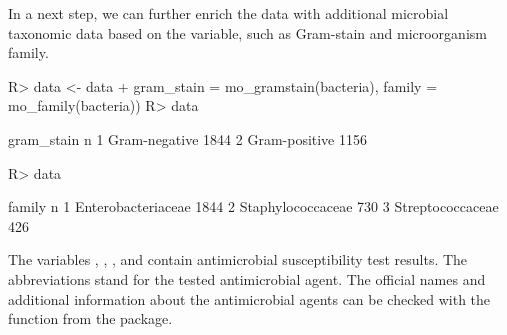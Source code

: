\documentclass[article, shortnames]{jss}
\newcommand{\fct}[1]{\code{#1()}}
\begin{document}
%
In a next step, we can further enrich the data with additional microbial
taxonomic data based on the  variable, such as Gram-stain and
microorganism family.
%
\begin{CodeChunk}
\begin{CodeInput}
R> data <- data %
+    gram_stain = mo_gramstain(bacteria), family = mo_family(bacteria))
R> data %
\end{CodeInput}
\begin{CodeOutput}
     gram_stain    n
1 Gram-negative 1844
2 Gram-positive 1156
\end{CodeOutput}
\begin{CodeInput}
R> data %
\end{CodeInput}
\begin{CodeOutput}
              family    n
1 Enterobacteriaceae 1844
2  Staphylococcaceae  730
3   Streptococcaceae  426
\end{CodeOutput}
\end{CodeChunk}
%
The variables , , , and  contain antimicrobial
susceptibility test results.  The abbreviations stand for the tested
antimicrobial agent.  The official names and additional information about
the antimicrobial agents can be checked with the \fct{ab\_info} function
from the  package.
%
\end{document}
